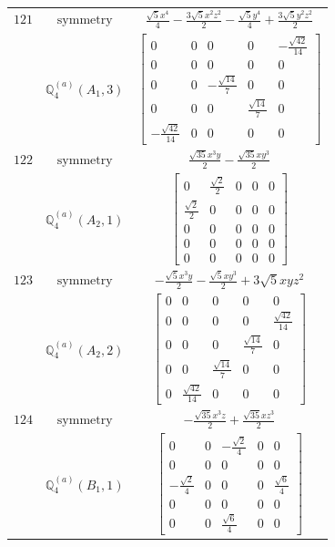 \documentclass[fleqn,8pt,landscape]{jsarticle}
\begin{document}
\begin{longtable}{ccc}
$ 121 $ & $ \text{symmetry} $ & $ \frac{\sqrt{5} x^{4}}{4} - \frac{3 \sqrt{5} x^{2} z^{2}}{2} - \frac{\sqrt{5} y^{4}}{4} + \frac{3 \sqrt{5} y^{2} z^{2}}{2} $ \\
$  $ & $ \mathbb{Q}_{4}^{(a)}(A_{1},3) $ & $ \begin{bmatrix} 0 & 0 & 0 & 0 & - \frac{\sqrt{42}}{14} \\ 0 & 0 & 0 & 0 & 0 \\ 0 & 0 & - \frac{\sqrt{14}}{7} & 0 & 0 \\ 0 & 0 & 0 & \frac{\sqrt{14}}{7} & 0 \\ - \frac{\sqrt{42}}{14} & 0 & 0 & 0 & 0 \end{bmatrix} $ \\ \hline
$ 122 $ & $ \text{symmetry} $ & $ \frac{\sqrt{35} x^{3} y}{2} - \frac{\sqrt{35} x y^{3}}{2} $ \\
$  $ & $ \mathbb{Q}_{4}^{(a)}(A_{2},1) $ & $ \begin{bmatrix} 0 & \frac{\sqrt{2}}{2} & 0 & 0 & 0 \\ \frac{\sqrt{2}}{2} & 0 & 0 & 0 & 0 \\ 0 & 0 & 0 & 0 & 0 \\ 0 & 0 & 0 & 0 & 0 \\ 0 & 0 & 0 & 0 & 0 \end{bmatrix} $ \\ \hline
$ 123 $ & $ \text{symmetry} $ & $ - \frac{\sqrt{5} x^{3} y}{2} - \frac{\sqrt{5} x y^{3}}{2} + 3 \sqrt{5} x y z^{2} $ \\
$  $ & $ \mathbb{Q}_{4}^{(a)}(A_{2},2) $ & $ \begin{bmatrix} 0 & 0 & 0 & 0 & 0 \\ 0 & 0 & 0 & 0 & \frac{\sqrt{42}}{14} \\ 0 & 0 & 0 & \frac{\sqrt{14}}{7} & 0 \\ 0 & 0 & \frac{\sqrt{14}}{7} & 0 & 0 \\ 0 & \frac{\sqrt{42}}{14} & 0 & 0 & 0 \end{bmatrix} $ \\ \hline
$ 124 $ & $ \text{symmetry} $ & $ - \frac{\sqrt{35} x^{3} z}{2} + \frac{\sqrt{35} x z^{3}}{2} $ \\
$  $ & $ \mathbb{Q}_{4}^{(a)}(B_{1},1) $ & $ \begin{bmatrix} 0 & 0 & - \frac{\sqrt{2}}{4} & 0 & 0 \\ 0 & 0 & 0 & 0 & 0 \\ - \frac{\sqrt{2}}{4} & 0 & 0 & 0 & \frac{\sqrt{6}}{4} \\ 0 & 0 & 0 & 0 & 0 \\ 0 & 0 & \frac{\sqrt{6}}{4} & 0 & 0 \end{bmatrix} $ \\ \hline

\end{longtable}
\end{document}

